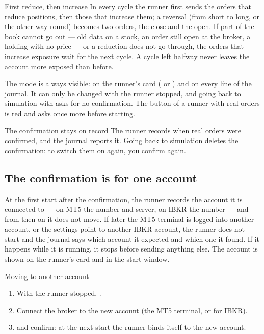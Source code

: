 \begin{nota}{First reduce, then increase}
In every cycle the runner first sends the orders that reduce positions,
then those that increase them; a reversal (from short to long, or the other
way round) becomes two orders, the close and the open. If part of the book
cannot go out --- old data on a stock, an order still open at the broker, a
holding with no price --- or a reduction does not go through, the orders
that increase exposure wait for the next cycle. A cycle left halfway never
leaves the account more exposed than before.
\end{nota}

\noindent
The mode is always visible: on the runner's card ( or
) and on every line of the journal. It can only be changed
with the runner stopped, and going back to simulation with  asks for no confirmation. The  button of a runner
with real orders is red and asks once more before starting.

\begin{nota}{The confirmation stays on record}
The runner records when real orders were confirmed, and the journal reports
it. Going back to simulation deletes the confirmation: to switch them on
again, you confirm again.
\end{nota}

\subsection{The confirmation is for one account}\label{sez:bound-account}

At the first start after the confirmation, the runner records the account it
is connected to --- on MT5 the number and server, on IBKR the number --- and
from then on it does not move. If later the MT5 terminal is logged into
another account, or the  settings point to another IBKR
account, the runner does not start and the journal says which account it
expected and which one it found. If it happens while it is running, it stops
before sending anything else. The account is shown on the runner's card and
in the start window.

\begin{pratica}{Moving to another account}
\begin{enumerate}
  \item With the runner stopped, .
  \item Connect the broker to the new account (the MT5 terminal, or
         for IBKR).
  \item {} and confirm: at the next start the
        runner binds itself to the new account.
\end{enumerate}
\end{pratica}

